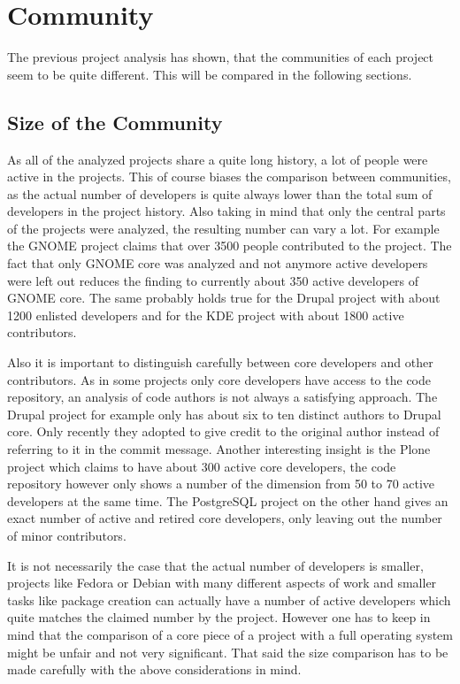 
\section{Community} %

The previous project analysis has shown, that the communities of each project
seem to be quite different. This will be compared in the following sections.

\subsection{Size of the Community} %

As all of the analyzed projects share a quite long history, a lot of people
were active in the projects. This of course biases the comparison between
communities, as the actual number of developers is quite always lower than the
total sum of developers in the project history. Also taking in mind that only
the central parts of the projects were analyzed, the resulting number can vary
a lot. For example the GNOME project claims that over 3500 people contributed
to the project. The fact that only GNOME core was analyzed and not anymore
active developers were left out reduces the finding to currently about 350
active developers of GNOME core. The same probably holds true for the Drupal
project with about 1200 enlisted developers and for the KDE project with about
1800 active contributors.

Also it is important to distinguish carefully between core developers and other
contributors. As in some projects only core developers have access to the code
repository, an analysis of code authors is not always a satisfying approach.
The Drupal project for example only has about six to ten distinct authors to
Drupal core. Only recently they adopted to give credit to the original author
instead of referring to it in the commit message. Another interesting insight
is the Plone project which claims to have about 300 active core developers, the
code repository however only shows a number of the dimension from 50 to 70
active developers at the same time. The PostgreSQL project on the other hand
gives an exact number of active and retired core developers, only leaving out
the number of minor contributors.

It is not necessarily the case that the actual number of developers is smaller,
projects like Fedora or Debian with many different aspects of work and smaller
tasks like package creation can actually have a number of active developers
which quite matches the claimed number by the project. However one has to keep
in mind that the comparison of a core piece of a project with a full operating
system might be unfair and not very significant. That said the size comparison
has to be made carefully with the above considerations in mind.

